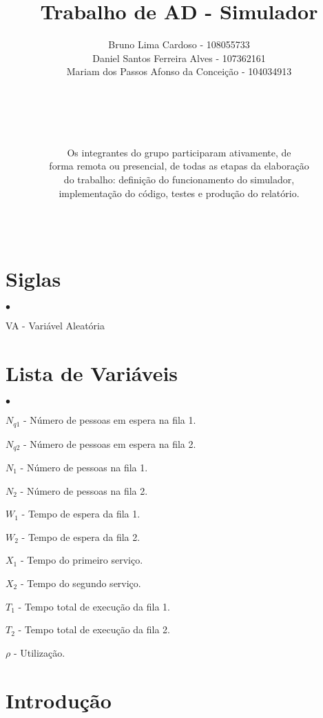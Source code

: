 \documentclass[a4paper,12pt]{report}
\title{Trabalho de AD - Simulador}
\author{Bruno Lima Cardoso - 108055733 \\
  Daniel Santos Ferreira Alves - 107362161 \\
  Mariam dos Passos Afonso da Conceição - 104034913 \\
\\
\\
\\
\\
\\
Os integrantes do grupo participaram ativamente, de \\
forma remota ou presencial, de todas as etapas da elaboração \\
do trabalho: definição do funcionamento do simulador, \\
implementação do código, testes e produção do relatório.
\\
\\
\\
}
\begin{document}

\maketitle

\begin{abstract}
\end{abstract}

\chapter*{Siglas}
\begin{list}{$\bullet$}{}
  \item[VA] - Variável Aleatória
  \item[]
\end{list}

\chapter*{Lista de Variáveis}
\begin{list}{$\bullet$}{}
  \item[$N_{q1}$] - Número de pessoas em espera na fila 1.
  \item[$N_{q2}$] - Número de pessoas em espera na fila 2.
  \item[$N_1$] - Número de pessoas na fila 1.
  \item[$N_2$] - Número de pessoas na fila 2.
  \item[$W_1$] - Tempo de espera da fila 1.
  \item[$W_2$] - Tempo de espera da fila 2.
  \item[$X_1$] - Tempo do primeiro serviço.
  \item[$X_2$] - Tempo do segundo serviço.
  \item[$T_1$] - Tempo total de execução da fila 1.
  \item[$T_2$] - Tempo total de execução da fila 2.
  \item[$\rho$] - Utilização.
\end{list}

\tableofcontents

\listoffigures

\listoftables

\chapter{Introdução}
\end{document}

